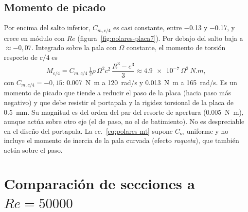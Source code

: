 \subsection{Momento de picado}
Por encima del salto inferior, $C_{m,c/4}$ es casi constante, entre \num{-0.13} y
\num{-0.17}, y crece en módulo con $Re$ (figura~\ref{fig:polares-placa7}). Por debajo
del salto baja a $\approx-0{,}07$. Integrado sobre la pala con
$\Omega$ constante, el momento de torsión respecto de $c/4$ es
\begin{equation}
  M_{c/4}=C_{m,c/4}\,\tfrac12\rho\,\Omega^2c^2\,\frac{R^3-e^3}{3}
  \approx\num{4.9e-7}\,\Omega^2\ \si{N.m},
  \label{eq:polares-mt}
\end{equation}
con $C_{m,c/4}=-0{,}15$: \SI{0.007}{N.m} a \SI{120}{rad/s} y \SI{0.013}{N.m} a
\SI{165}{rad/s}. Es un momento de picado que tiende a reducir el paso de la placa (hacia
paso más negativo) y que debe resistir el portapala y la rigidez torsional de la placa de
\SI{0.5}{mm}. Su magnitud es del orden del par del resorte de apertura
(\SI{0.005}{N.m}), aunque actúa sobre otro eje (el de paso, no el de batimiento). No es
despreciable en el diseño del portapala. La ec.~\eqref{eq:polares-mt} supone $C_m$
uniforme y no incluye el momento de inercia de la pala curvada (efecto \emph{raqueta}),
que también actúa sobre el paso.


\section{Comparación de secciones a $Re=\num{50000}$}\label{sec:polares-comp}


